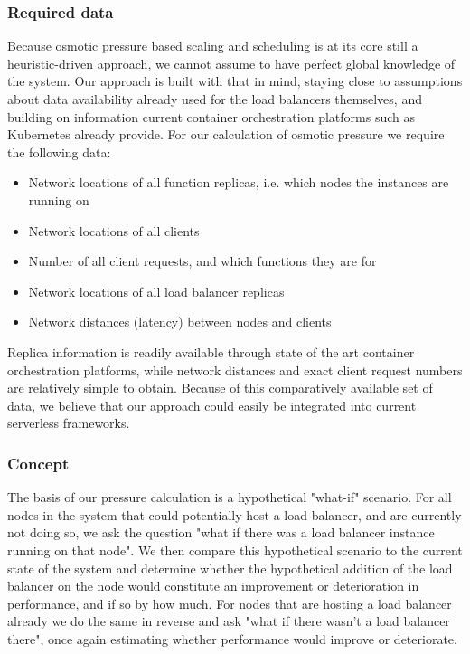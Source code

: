 \subsubsection{Required data}
Because osmotic pressure based scaling and scheduling is at its core still a heuristic-driven approach, we cannot assume to have perfect global knowledge of the system.
Our approach is built with that in mind, staying close to assumptions about data availability already used for the load balancers themselves, and building on information current container orchestration platforms such as Kubernetes already provide.
For our calculation of osmotic pressure we require the following data:
\begin{itemize}
    \item Network locations of all function replicas, i.e. which nodes the instances are running on
    \item Network locations of all clients
    \item Number of all client requests, and which functions they are for
    \item Network locations of all load balancer replicas
    \item Network distances (latency) between nodes and clients
\end{itemize}
Replica information is readily available through state of the art container orchestration platforms, while network distances and exact client request numbers are relatively simple to obtain.
Because of this comparatively available set of data, we believe that our approach could easily be integrated into current serverless frameworks.
\subsubsection{Concept}
The basis of our pressure calculation is a hypothetical "what-if" scenario.
For all nodes in the system that could potentially host a load balancer, and are currently not doing so, we ask the question "what if there was a load balancer instance running on that node".
We then compare this hypothetical scenario to the current state of the system and determine whether the hypothetical addition of the load balancer on the node would constitute an improvement or deterioration in performance, and if so by how much.
For nodes that are hosting a load balancer already we do the same in reverse and ask "what if there wasn't a load balancer there", once again estimating whether performance would improve or deteriorate.

